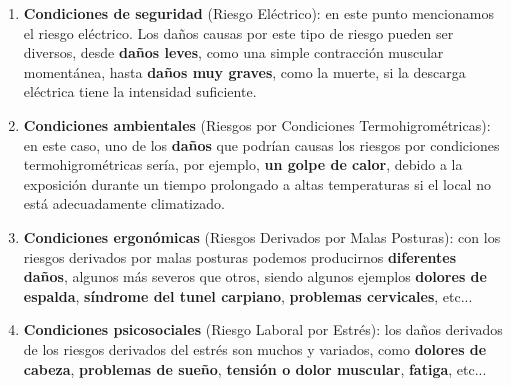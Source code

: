 \begin{enumerate}[label=\alph*)]
    \item \textbf{Condiciones de seguridad} (Riesgo Eléctrico): en este punto mencionamos el riesgo eléctrico. Los daños causas por este tipo de riesgo pueden ser diversos, desde \textbf{daños leves}, como una simple contracción muscular momentánea, hasta \textbf{daños muy graves}, como la muerte, si la descarga eléctrica tiene la intensidad suficiente.

    \item \textbf{Condiciones ambientales} (Riesgos por Condiciones Termohigrométricas): en este caso, uno de los \textbf{daños} que podrían causas los riesgos por condiciones termohigrométricas sería, por ejemplo, \textbf{un golpe de calor}, debido a la exposición durante un tiempo prolongado a altas temperaturas si el local no está adecuadamente climatizado.

    \item \textbf{Condiciones ergonómicas} (Riesgos Derivados por Malas Posturas): con los riesgos derivados por malas posturas podemos producirnos \textbf{diferentes daños}, algunos más severos que otros, siendo algunos ejemplos \textbf{dolores de espalda}, \textbf{síndrome del tunel carpiano}, \textbf{problemas cervicales}, etc...

    \item \textbf{Condiciones psicosociales} (Riesgo Laboral por Estrés): los daños derivados de los riesgos derivados del estrés son muchos y variados, como \textbf{dolores de cabeza}, \textbf{problemas de sueño}, \textbf{tensión o dolor muscular}, \textbf{fatiga}, etc...
\end{enumerate}






\newpage



